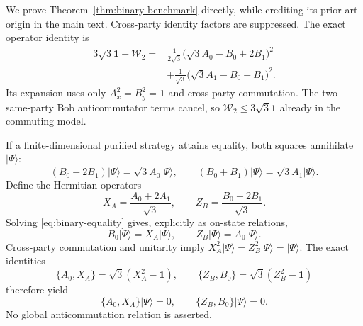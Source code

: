 \documentclass[11pt]{article}
\theoremstyle{definition}
\theoremstyle{remark}
\newcommand{\Id}{\mathbf 1}
\begin{document}
We prove Theorem~\ref{thm:binary-benchmark} directly, while crediting its
prior-art origin in the main text.  Cross-party identity factors are
suppressed.  The exact operator identity is
\begin{equation}
\begin{aligned}
 3\sqrt3\Id-\mathcal W_2
 ={}&\frac1{2\sqrt3}
 \bigl(\sqrt3A_0-B_0+2B_1\bigr)^2\\
 &+\frac1{\sqrt3}
 \bigl(\sqrt3A_1-B_0-B_1\bigr)^2.
\end{aligned}
\label{eq:binary-sos}
\end{equation}
Its expansion uses only \(A_x^2=B_y^2=\Id\) and cross-party commutation.
The two same-party Bob anticommutator terms cancel, so
\(\mathcal W_2\leq3\sqrt3\Id\) already in the commuting model.

If a finite-dimensional purified strategy attains equality, both squares
annihilate \(\lvert\Psi\rangle\):
\begin{equation}
 (B_0-2B_1)\lvert\Psi\rangle=\sqrt3A_0\lvert\Psi\rangle,
 \qquad
 (B_0+B_1)\lvert\Psi\rangle=\sqrt3A_1\lvert\Psi\rangle.
 \label{eq:binary-equality}
\end{equation}
Define the Hermitian operators
\[
 X_A=\frac{A_0+2A_1}{\sqrt3},
 \qquad
 Z_B=\frac{B_0-2B_1}{\sqrt3}.
\]
Solving \eqref{eq:binary-equality} gives, explicitly as on-state relations,
\[
 B_0\lvert\Psi\rangle=X_A\lvert\Psi\rangle,
 \qquad
 Z_B\lvert\Psi\rangle=A_0\lvert\Psi\rangle.
\]
Cross-party commutation and unitarity imply
\(X_A^2\lvert\Psi\rangle=Z_B^2\lvert\Psi\rangle
=\lvert\Psi\rangle\).  The exact identities
\[
 \{A_0,X_A\}=\sqrt3(X_A^2-\Id),
 \qquad
 \{Z_B,B_0\}=\sqrt3(Z_B^2-\Id)
\]
therefore yield
\begin{equation}
 \{A_0,X_A\}\lvert\Psi\rangle=0,
 \qquad
 \{Z_B,B_0\}\lvert\Psi\rangle=0.
 \label{eq:binary-anticommutation}
\end{equation}
No global anticommutation relation is asserted.
\end{document}
